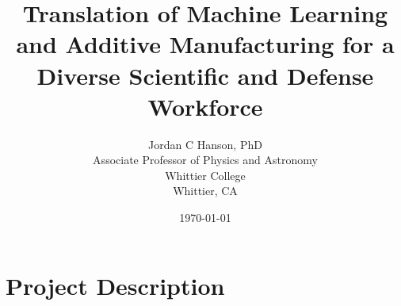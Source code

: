\documentclass[10pt,twoside,openany]{book}
\title{Translation of Machine Learning and Additive Manufacturing for a Diverse Scientific and Defense Workforce}
\author{Jordan C Hanson, PhD \\ Associate Professor of Physics and Astronomy \\ Whittier College \\ Whittier, CA}
\date{\today}
\begin{document}
\maketitle
\begin{flushleft}

\end{flushleft}

\tableofcontents

\chapter{Project Description}
\begin{flushleft}

\end{flushleft}

%
%
%
%
%
%
%

\small


 
\end{document}
